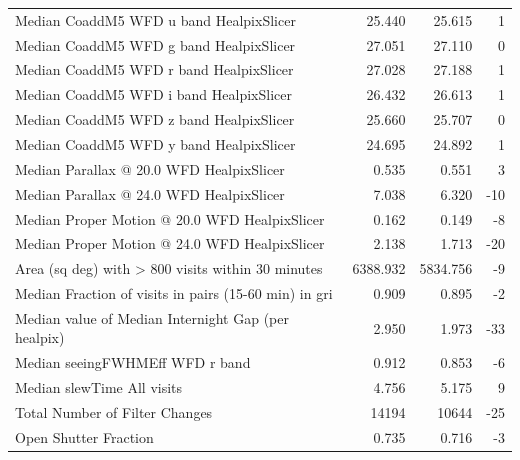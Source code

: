 \documentclass[DM,lsstdraft,authoryear,toc]{lsstdoc}
\begin{document}
\begin{table}
\begin{center}
\begin{tabular}{lrrr}
Median CoaddM5 WFD u band HealpixSlicer            &              25.440 &              25.615 &          1 \\
Median CoaddM5 WFD g band HealpixSlicer            &              27.051 &              27.110 &          0 \\
Median CoaddM5 WFD r band HealpixSlicer            &              27.028 &              27.188 &          1 \\
Median CoaddM5 WFD i band HealpixSlicer            &              26.432 &              26.613 &          1 \\
Median CoaddM5 WFD z band HealpixSlicer            &              25.660 &              25.707 &          0 \\
Median CoaddM5 WFD y band HealpixSlicer            &              24.695 &              24.892 &          1 \\
Median Parallax @ 20.0 WFD HealpixSlicer           &               0.535 &               0.551 &          3 \\
Median Parallax @ 24.0 WFD HealpixSlicer           &               7.038 &               6.320 &        -10 \\
Median Proper Motion @ 20.0 WFD HealpixSlicer      &               0.162 &               0.149 &         -8 \\
Median Proper Motion @ 24.0 WFD HealpixSlicer      &               2.138 &               1.713 &        -20 \\
Area (sq deg) with > 800 visits within 30 minutes &            6388.932 &            5834.756 &         -9 \\
Median Fraction of visits in pairs (15-60 min) in gri &               0.909 &               0.895 &         -2 \\
Median value of Median Internight Gap (per healpix)  &               2.950 &               1.973 &        -33 \\
Median seeingFWHMEff WFD r band                        &               0.912 &               0.853 &         -6 \\
Median slewTime All visits                         &               4.756 &               5.175 &          9 \\
Total Number of Filter Changes                    &               14194 &               10644 &        -25 \\
Open Shutter Fraction                                &               0.735 &               0.716 &         -3 \\
\bottomrule
\end{tabular}
\end{center}
\label{tab:baseline_comparison}
\end{table}
\end{document}
